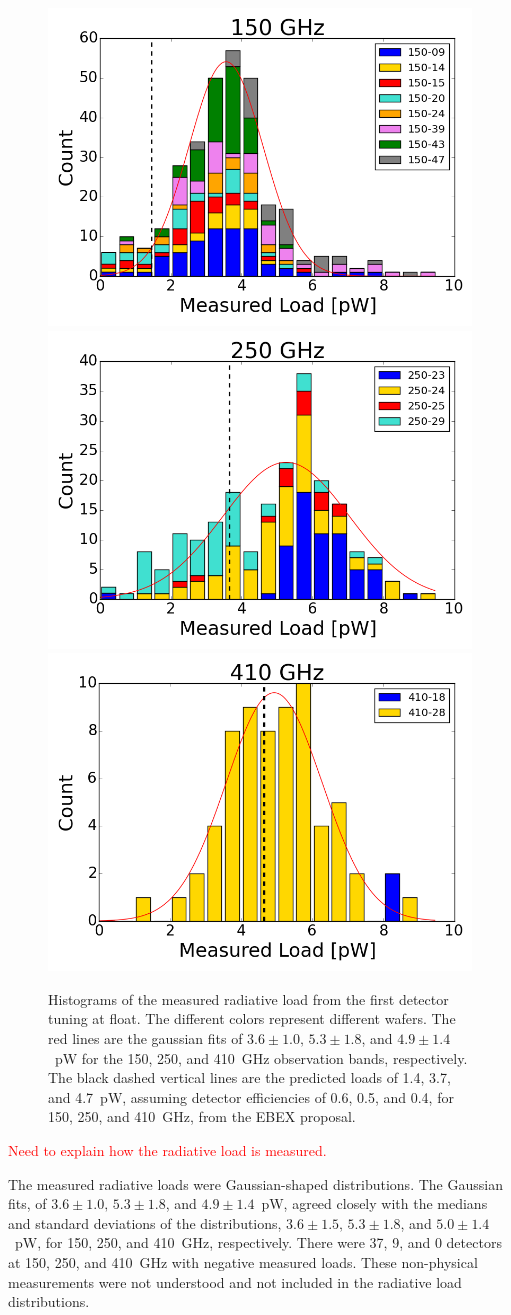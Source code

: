 \begin{figure}[ht!]
\begin{center}
\includegraphics[width=0.32\columnwidth]{figures/thesis_150_radiative_load_hist.png}
\includegraphics[width=0.32\columnwidth]{figures/thesis_250_radiative_load_hist}
\includegraphics[width=0.32\columnwidth]{figures/thesis_410_radiative_load_hist}
\caption{Histograms of the measured radiative load from the first detector tuning at float. The different colors represent 
different wafers.  
The red lines are the gaussian fits of $3.6\pm 1.0, \, 5.3\pm 1.8$, and $4.9 \pm 1.4$~pW for the 150, 250, and 410~GHz observation bands, respectively. 
The black dashed vertical lines are the predicted loads of 1.4, 3.7, and 4.7~pW, assuming detector efficiencies of 0.6, 0.5, and 0.4, for 150, 250, and 410~GHz, from the \ac{EBEX} proposal. 
\label{fig:radiative_load_histograms} }
\end{center}
\end{figure}

\textcolor{red}{Need to explain how the radiative load is measured.}

The measured radiative loads were Gaussian-shaped distributions. 
The Gaussian fits, of $3.6\pm 1.0, \, 5.3\pm 1.8$, and $4.9 \pm 1.4$~pW, agreed closely with the  medians and standard deviations of the distributions, $3.6\pm 1.5, \, 5.3\pm 1.8$, and $5.0 \pm 1.4$~pW, 
for 150, 250, and 410~GHz, respectively. 
There were 37, 9, and 0 detectors at 150, 250, and 410~GHz with negative measured loads. 
These non-physical measurements were not understood and not included in the radiative load distributions. 

